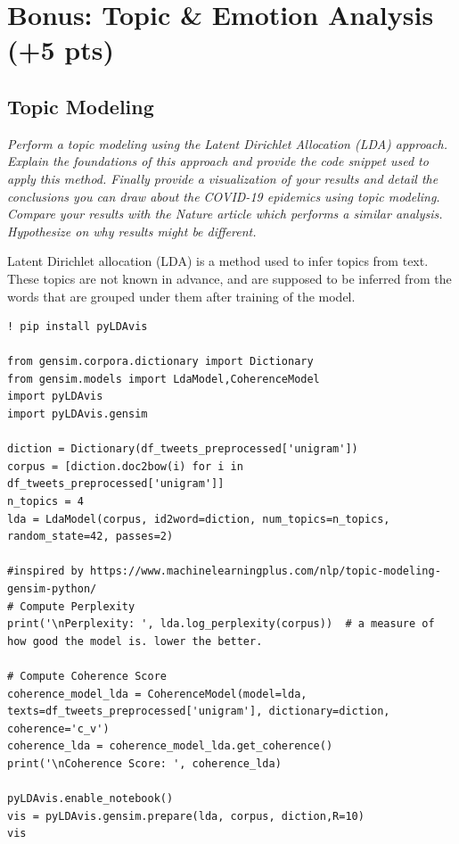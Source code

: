 \section*{Bonus: Topic \& Emotion Analysis (+5 pts)}

\subsection{Topic Modeling}
\textit{Perform a topic modeling using the Latent Dirichlet Allocation (LDA) approach. Explain the foundations of this approach and provide the code snippet used to apply this method. Finally provide a visualization of your results and detail the conclusions you can draw about the COVID-19 epidemics using topic modeling. Compare your results with the Nature article which performs a similar analysis. Hypothesize on why results might be different.}

Latent Dirichlet allocation (LDA) \cite{lda} is a method used to infer topics from text. These topics are not known in advance, and are supposed to be inferred from the words that are grouped under them after training of the model.

\begin{listing*}[t]
\begin{verbatim}
! pip install pyLDAvis

from gensim.corpora.dictionary import Dictionary
from gensim.models import LdaModel,CoherenceModel
import pyLDAvis
import pyLDAvis.gensim

diction = Dictionary(df_tweets_preprocessed['unigram'])
corpus = [diction.doc2bow(i) for i in df_tweets_preprocessed['unigram']]
n_topics = 4
lda = LdaModel(corpus, id2word=diction, num_topics=n_topics, random_state=42, passes=2)

#inspired by https://www.machinelearningplus.com/nlp/topic-modeling-gensim-python/
# Compute Perplexity
print('\nPerplexity: ', lda.log_perplexity(corpus))  # a measure of how good the model is. lower the better.

# Compute Coherence Score
coherence_model_lda = CoherenceModel(model=lda, texts=df_tweets_preprocessed['unigram'], dictionary=diction, coherence='c_v')
coherence_lda = coherence_model_lda.get_coherence()
print('\nCoherence Score: ', coherence_lda)

pyLDAvis.enable_notebook()
vis = pyLDAvis.gensim.prepare(lda, corpus, diction,R=10)
vis

\end{verbatim}
\caption{}
\label{listing:pb-code1}
\end{listing*}


